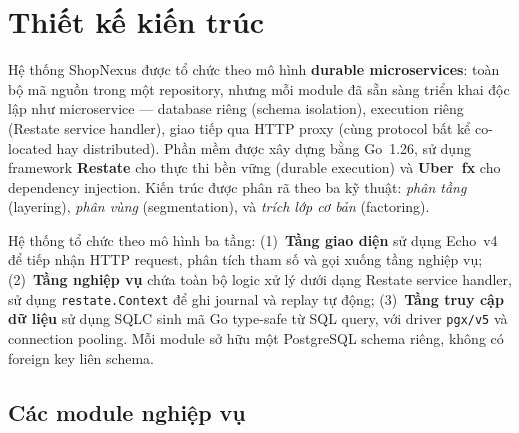 
\section{Thiết kế kiến trúc}
\label{sec:architecture}

Hệ thống ShopNexus được tổ chức theo mô hình \textbf{durable microservices}: toàn bộ mã nguồn trong một repository, nhưng mỗi module đã sẵn sàng triển khai độc lập như microservice --- database riêng (schema isolation), execution riêng (Restate service handler), giao tiếp qua HTTP proxy (cùng protocol bất kể co-located hay distributed). Phần mềm được xây dựng bằng Go~1.26, sử dụng framework \textbf{Restate} cho thực thi bền vững (durable execution) và \textbf{Uber~fx} cho dependency injection. Kiến trúc được phân rã theo ba kỹ thuật: \textit{phân tầng} (layering), \textit{phân vùng} (segmentation), và \textit{trích lớp cơ bản} (factoring).

Hệ thống tổ chức theo mô hình ba tầng: (1)~\textbf{Tầng giao diện} sử dụng Echo~v4 để tiếp nhận HTTP request, phân tích tham số và gọi xuống tầng nghiệp vụ; (2)~\textbf{Tầng nghiệp vụ} chứa toàn bộ logic xử lý dưới dạng Restate service handler, sử dụng \texttt{restate.Context} để ghi journal và replay tự động; (3)~\textbf{Tầng truy cập dữ liệu} sử dụng SQLC sinh mã Go type-safe từ SQL query, với driver \texttt{pgx/v5} và connection pooling. Mỗi module sở hữu một PostgreSQL schema riêng, không có foreign key liên schema.

\subsection{Các module nghiệp vụ}
\label{subsec:modules}

